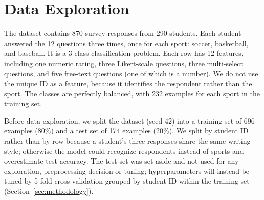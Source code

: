 \documentclass[12pt]{article}
\begin{document}
\section{Data Exploration}\label{sec:data-exploration}

The dataset contains 870 survey responses from 290 students. Each student answered the
12 questions three times, once for each sport: soccer, basketball, and baseball. It is a
3-class classification problem. Each row has 12 features, including one numeric rating,
three Likert-scale questions, three multi-select questions, and five free-text questions
(one of which is a number). We do not use the unique ID as a feature, because it
identifies the respondent rather than the sport. The classes are perfectly balanced,
with 232 examples for each sport in the training set.

Before data exploration, we split the dataset (seed 42) into a training set of 696
examples (80\%) and a test set of 174 examples (20\%). We split by student ID rather
than by row because a student's three responses share the same writing style; otherwise
the model could recognize respondents instead of sports and overestimate test accuracy.
The test set was set aside and not used for any exploration, preprocessing decision or
tuning; hyperparameters will instead be tuned by 5-fold cross-validation grouped by student
ID within the training set (Section~\ref{sec:methodology}).
\end{document}

